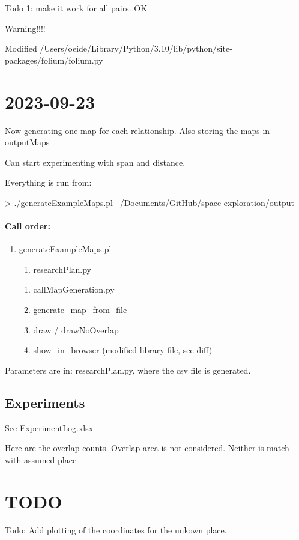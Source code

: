 \documentclass[12pt]{book}
\begin{document}
Todo 1: make it work for all pairs. OK

Warning!!!!

Modified /Users/oeide/Library/Python/3.10/lib/python/site-packages/folium/folium.py

\section{2023-09-23}

Now generating one map for each relationship. Also storing the maps in outputMaps

Can start experimenting with span and distance. 

Everything is run from: 

> ./generateExampleMaps.pl ~/Documents/GitHub/space-exploration/output


\paragraph{Call order:}

\begin{enumerate}
\item generateExampleMaps.pl
\begin{enumerate}
\item researchPlan.py
\end{enumerate}
\begin{enumerate}
\item callMapGeneration.py
\item generate\_map\_from\_file
\item draw / drawNoOverlap
\item show\_in\_browser (modified library file, see diff)
\end{enumerate}
\end{enumerate}

Parameters are in: researchPlan.py, where the csv file is generated.

\subsection{Experiments}

See ExperimentLog.xlsx

Here are the overlap counts. Overlap area is not considered. Neither is match with assumed place

\section{TODO}

Todo: Add plotting of the coordinates for the unkown place.



\end{document}
